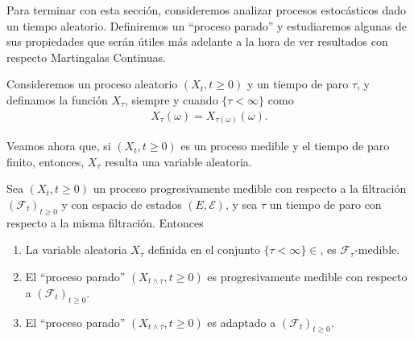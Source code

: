 Para terminar con esta sección, consideremos analizar procesos estocásticos dado un tiempo aleatorio. Definiremos un ``proceso parado'' y estudiaremos algunas de sus propiedades que serán útiles más adelante a la hora de ver resultados con respecto Martingalas Continuas.

\begin{definition}
	Consideremos un proceso aleatorio $(X_t, t \geq 0)$ y un tiempo de paro $\tau$, y definamos la función $X_{\tau}$, siempre y cuando $\{\tau < \infty\}$ como
    \begin{align*}
    X_{\tau}(\omega) = X_{\tau(\omega)}(\omega).
    \end{align*}
\end{definition}
Veamos ahora que, si $(X_t, t \geq 0)$ es un proceso medible y el tiempo de paro finito, entonces, $X_{\tau}$ resulta una variable aleatoria.

\begin{theorem}
	Sea $(X_t, t \geq 0)$ un proceso progresivamente medible con respecto a la filtración $(\mathcal{F}_t)_{t \geq 0}$ y con espacio de estados $(E, \mathcal{E})$, y sea $\tau$ un tiempo de paro con respecto a la misma filtración. Entonces
    \begin{enumerate}
    \item La variable aleatoria $X_{\tau}$ definida en el conjunto $\{\tau < \infty\} \in $, es $\mathcal{F}_{\tau}$-medible.
    \item El ``proceso parado'' $(X_{t \wedge \tau}, t \geq 0)$ es progresivamente medible con respecto a $(\mathcal{F}_t)_{t \geq 0}$.
    \item El ``proceso parado'' $(X_{t \wedge \tau}, t \geq 0)$ es adaptado a $(\mathcal{F}_t)_{t \geq 0}$.
    \end{enumerate}
\end{theorem}

